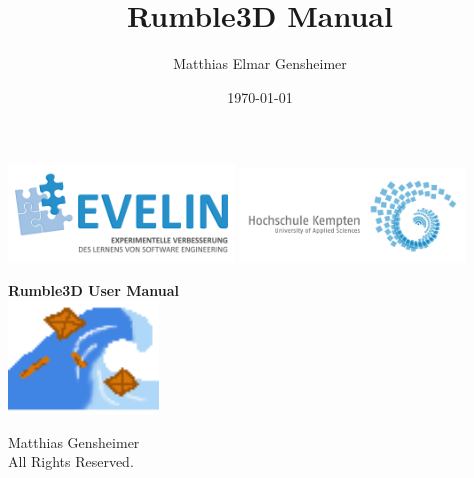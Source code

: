 \documentclass[12p, paper=a4, leqno, colorinlistoftodos]{article}
\author{Matthias Elmar Gensheimer}
\title{Rumble3D Manual}
\date{\today}
\begin{document}
	
	
	\begin{titlepage}
		\begin{flushright}
			\includegraphics[width=0.45\textwidth]{resources/Evelin_Logo_Final_4fbg}
			\includegraphics[width=0.45\textwidth]{resources/hs_kempten_logo}
		\end{flushright}
		\begin{center}
			\vspace*{\fill}
			\LARGE\textbf{Rumble3D User Manual}\\		
			
			\vspace{1cm}
			\vspace{2cm}
			\includegraphics[width=0.30\textwidth]{resources/Rumble3DLogo}
			
			\vfill
			\Large{ Matthias Gensheimer}\\
			\Large{All Rights Reserved.}
		\end{center}
		
	\end{titlepage}
	
	\mbox{}
	\thispagestyle{empty}
	\newpage
	
\end{document}
